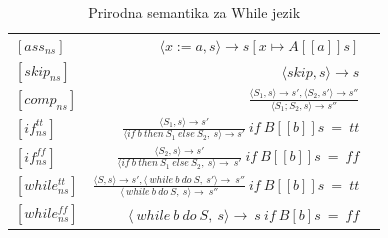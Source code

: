 \documentclass[a4paper]{article}
\begin{document}
{\begin{table}[h]
       \caption{Prirodna semantika za While jezik}
    	\begin{center}
        \begin{tabular}{lrc}\hline
        \hline
        \hline
        $[ass_{ns}] $ & $ \langle x := a, s \rangle \rightarrow s[x \mapsto A[[a]]s]$    \\  [6pt]
        $[skip_{ns}] $ & $ \langle skip, s \rangle \rightarrow s$   \\ [6pt]
         $[comp_{ns}] $ & $ \frac{\langle S_1, s \rangle \rightarrow s', \langle S_2, s' \rangle \rightarrow s''}{\langle S_1;S_2, s \rangle \rightarrow s''}$ \\[6pt]
            $[if^{tt}_{ns}] $ & $ \frac{\langle S_1, s \rangle \rightarrow s'}{\langle if\ b\ then\ S_1\ else\ S_2,\ s \rangle \rightarrow s'}\  if\ B[[b]]s\ =\ tt $ \\ [6pt]
            $[if^{ff}_{ns}] $ & $ \frac{\langle S_2, s \rangle \rightarrow s'}{\langle if\ b\ then\ S_1\ else\ S_2,\ s \rangle \rightarrow\ s'}\  if\ B[[b]]s\ =\ ff $ \\ [6pt]
            $[while^{tt}_{ns}] $ & $ \frac{\langle S, s \rangle \rightarrow s', \langle\ while\ b\ do\ S,\ s' \rangle \rightarrow\ s''}{\langle\ while\ b\ do\ S,\ s \rangle \rightarrow\ s''}\ if\ B[[b]]s\ =\ tt $ \\ [6pt]
             $[while^{ff}_{ns}] $ & $ \langle\ while\ b\ do\ S,\ s \rangle \rightarrow\ s\ if\ B[b]s\ =\ ff$ \\ [6pt]
          \hline \hline
        \end{tabular}
     \label{tab:b}
    \end{center}
\end{table}

}
\end{document}
